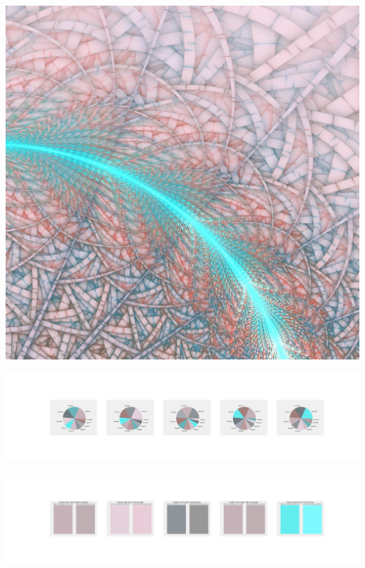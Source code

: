 \documentclass[11pt]{article}
\begin{document}
\begin{landscape}
    \begin{center}
    \includegraphics[width=\textwidth]{./nbimg/file (236).jpg}
    \end{center}

    \begin{center}
    \includegraphics[width=250mm]{./nbimg/pie-152.jpg}
    \end{center}

    \begin{center}
    \includegraphics[width=250mm]{./nbimg/peak-152.jpg}
    \end{center}
    


\end{landscape}
\end{document}
